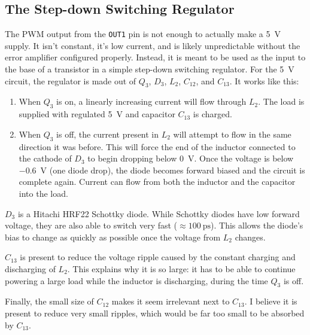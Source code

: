 \documentclass{article}
\newcommand{\chippin}{\texttt}
\newcommand{\model}{\textsf}
\begin{document}
\subsection{The Step-down Switching Regulator}
\label{sec:step-down_regulator}
The PWM output from the \chippin{OUT1} pin is not enough to actually
make a \qty{5}{\volt} supply. It isn't constant, it's low current, and
is likely unpredictable without the error amplifier configured
properly. Instead, it is meant to be used as the input to the base of
a transistor in a simple step-down switching regulator. For the
\qty{5}{\volt} circuit, the regulator is made out of $Q_3$, $D_3$,
$L_2$, $C_{12}$, and $C_{13}$. It works like this:

\begin{enumerate}
\item When $Q_3$ is on, a linearly increasing current will flow
  through $L_2$. The load is supplied with regulated \qty{5}{\volt}
  and capacitor $C_{13}$ is charged.
\item When $Q_3$ is off, the current present in $L_2$ will attempt to
  flow in the same direction it was before. This will force the end of
  the inductor connected to the cathode of $D_3$ to begin dropping
  below \qty{0}{\volt}. Once the voltage is below \qty{-0.6}{\volt}
  (one diode drop), the diode becomes forward biased and the circuit
  is complete again. Current can flow from both the inductor and the
  capacitor into the load.
\end{enumerate}

$D_3$ is a Hitachi \model{HRF22} Schottky diode. While Schottky diodes
have low forward voltage, they are also able to switch very fast
($\approx{}\qty{100}{\pico\second}$). This allows the diode's bias to
change as quickly as possible once the voltage from $L_2$ changes.

$C_{13}$ is present to reduce the voltage ripple caused by the
constant charging and discharging of $L_2$. This explains why it is so
large: it has to be able to continue powering a large load while the
inductor is discharging, during the time $Q_3$ is off.

Finally, the small size of $C_{12}$ makes it seem irrelevant next to
$C_{13}$. I believe it is present to reduce very small ripples, which
would be far too small to be absorbed by $C_{13}$.
\end{document}
